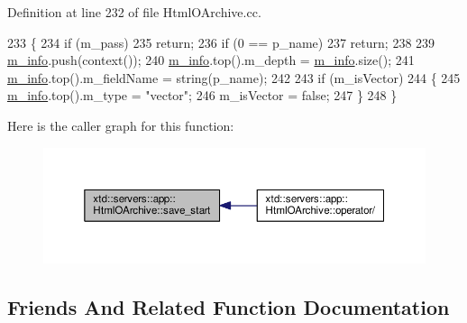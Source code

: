 Definition at line 232 of file Html\+O\+Archive.\+cc.


\begin{DoxyCode}
233 \{
234   \textcolor{keywordflow}{if} (m\_pass)
235     \textcolor{keywordflow}{return};
236   \textcolor{keywordflow}{if} (0 == p\_name)
237     \textcolor{keywordflow}{return};
238 
239   \hyperlink{classxtd_1_1servers_1_1app_1_1HtmlOArchive_a03bd854507f8457a3b5b575203108ff7}{m\_info}.push(context());
240   \hyperlink{classxtd_1_1servers_1_1app_1_1HtmlOArchive_a03bd854507f8457a3b5b575203108ff7}{m\_info}.top().m\_depth     = \hyperlink{classxtd_1_1servers_1_1app_1_1HtmlOArchive_a03bd854507f8457a3b5b575203108ff7}{m\_info}.size();
241   \hyperlink{classxtd_1_1servers_1_1app_1_1HtmlOArchive_a03bd854507f8457a3b5b575203108ff7}{m\_info}.top().m\_fieldName = string(p\_name);
242 
243   \textcolor{keywordflow}{if} (m\_isVector)
244   \{
245     \hyperlink{classxtd_1_1servers_1_1app_1_1HtmlOArchive_a03bd854507f8457a3b5b575203108ff7}{m\_info}.top().m\_type = \textcolor{stringliteral}{"vector"};
246     m\_isVector = \textcolor{keyword}{false};
247   \}
248 \}
\end{DoxyCode}


Here is the caller graph for this function\+:
\nopagebreak
\begin{figure}[H]
\begin{center}
\leavevmode
\includegraphics[width=350pt]{classxtd_1_1servers_1_1app_1_1HtmlOArchive_a8675544faff21c5a5acd0af123b48d6d_icgraph}
\end{center}
\end{figure}




\subsection{Friends And Related Function Documentation}
